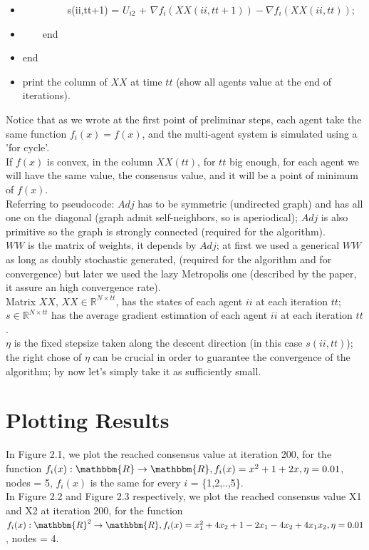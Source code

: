 \documentclass[a4paper,11pt,oneside]{book}
\begin{document}
{\begin{itemize}
\item[] ~~~~~~~~~s(ii,tt+1) = $U_{i2}$ + $\nabla f_i(XX(ii,tt+1))-\nabla f_i(XX(ii,tt))$;
\item[] ~~~~end
\item[] end
\item[] print the column of $XX$ at time $tt$ (show all agents value at the end of iterations).
\end{itemize}
\normalsize
\newpage
Notice that as we wrote at the first point of preliminar steps, each agent take the same function $f_{i}(x) = f(x)$, and the multi-agent system is simulated using a 'for cycle'.
 \\If $f(x)$ is convex, in the column $XX(tt)$, for $tt$ big enough, for each agent we will have the same value, the  consensus value, and it will be a point of minimum of $f(x)$.
 \\Referring to pseudocode: $Adj$ has to be symmetric (undirected graph) and has all one on the diagonal (graph admit self-neighbors, so is aperiodical); $Adj$ is also primitive so the graph is strongly connected (required for the algorithm).
 \\ $WW$ is the matrix of weights, it depends by $Adj$; at first we used a generical $WW$  as long as doubly stochastic generated, (required for the algorithm and for convergence) but later we used the lazy  Metropolis one (described by the paper, it assure an high convergence rate).
 \\Matrix $XX$, $XX \in \mathbb{R}^{{N}\times{tt}}$, has the states of each agent $ii$ at each iteration $tt$; $s \in \mathbb{R}^{{N}\times{tt}}$ has the average gradient estimation of each agent $ii$ at each iteration $tt$.
 \\$\eta$ is the fixed stepsize taken along the descent direction (in this case $s(ii,tt)$); the right chose of $\eta$ can be crucial in order to guarantee  the convergence of the algorithm; by now let's simply take it as sufficiently small.


\section{Plotting Results}
In Figure 2.1, we plot the reached consensus value at iteration 200, for the function $f_i(x): \mathbbm{R} \rightarrow \mathbbm{R}, f_i(x)= x^2 + 1 +2x , \eta = 0.01$, nodes = 5, $f_i(x)$ is the same for every $i$ = \{1,2,..,5\}.\\
In Figure 2.2 and Figure 2.3 respectively, we plot the reached consensus value X1 and X2 at iteration 200, for the function  $f_i(x): \mathbbm{R}^2 \rightarrow \mathbbm{R}, f_i(x)= x_1^2 + 4x_2 + 1 - 2x_1 - 4x_2 +4x_1x_2 , \eta = 0.01$, nodes = 4.
 
}
\end{document}
